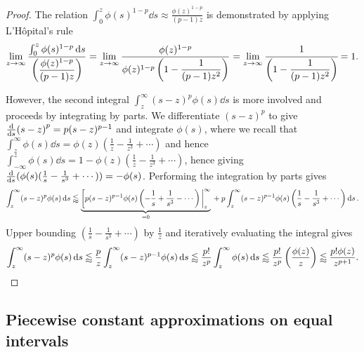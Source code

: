 \documentclass[manuscript,review]{acmart}
\begin{document}
\begin{proof}
The relation  $ \int_{0}^{z} \phi(s)^{1-p} \dd{s} \approx \tfrac{\phi(z)^{1-p}}{(p-1)z}  $ is demonstrated by applying L'H\^{o}pital's rule
\begin{equation*}
\lim_{z \to \infty} \dfrac{\int_{0}^{z} \phi(s)^{1-p} \dd{s}}{\left(\dfrac{\phi(z)^{1-p}}{(p-1)z}\right)} 
=  \lim_{z \to \infty} \dfrac{\phi(z)^{1-p}}{\phi(z)^{1-p}\left(1 - \dfrac{1}{(p-1)z^2} \right)} 
= \lim_{z \to \infty} \cfrac{1}{\left(1 - \dfrac{1}{(p-1)z^2}\right)} 
= 1.
\end{equation*}

However, the second integral $ \int_{z}^{\infty} (s-z)^p\phi(s) \dd{s} $ is more involved and proceeds by integrating by parts. We differentiate $ (s-z)^p $ to give $ \dv{s} (s-z)^p = p (s-z)^{p-1} $ and integrate $ \phi(s) $, where we recall that $ \int_{z}^{\infty} \phi(s) \dd{s}  = \phi(z)(\tfrac{1}{z} - \tfrac{1}{z^3} + \cdots) $ and hence $ \int_{-\infty}^{z} \phi(s) \dd{s}  = 1 -\phi(z)(\tfrac{1}{z} - \tfrac{1}{z^3} + \cdots) $, hence giving $ {\dv{s}} (\phi(s)(\tfrac{1}{s} - \tfrac{1}{s^3} + \cdots))  = -\phi(s) $. Performing the integration by parts gives
\begin{equation*}
\int_{z}^{\infty} (s-z)^p\phi(s) \dd{s} \lessapprox \underbrace{\eval[p(s-z)^{p-1}\phi(s)\left(-\dfrac{1}{s} + \dfrac{1}{s^3} - \cdots\right)|_{z}^{\infty}}_{{} = 0} {} + p \int_{z}^{\infty} (s-z)^{p-1} \phi(s) \left(\dfrac{1}{s} - \dfrac{1}{s^3} + \cdots\right) \dd{s}.
\end{equation*}
Upper bounding $ (\tfrac{1}{s} - \tfrac{1}{s^3} + \cdots )$ by $ \tfrac{1}{z} $ and iteratively evaluating the integral gives
\begin{equation*}
\int_{z}^{\infty} (s-z)^p\phi(s) \dd{s}
\lessapprox \dfrac{p}{z} \int_{z}^{\infty} (s-z)^{p-1} \phi(s) \dd{s} 
\lessapprox \dfrac{p!}{z^p} \int_{z}^{\infty} \phi(s) \dd{s} 
\lessapprox \dfrac{p!}{z^p} \left(\dfrac{\phi(z)}{z}\right) 
\lessapprox \frac{p!\phi(z)}{z^{p+1}}. \qedhere
\end{equation*}
\end{proof}

\subsection{Piecewise constant approximations on equal intervals}
\label{sec:piecewise_constant_approximations_on_equal_intervals}
\end{document}
